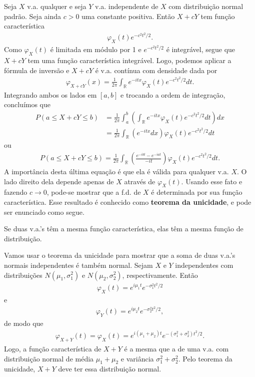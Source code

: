 \documentclass[../Notas.tex]{subfiles}
\begin{document}
Seja $X$ v.a. qualquer e seja $Y$ v.a. independente de $X$ com distribuição normal padrão. Seja ainda $c>0$ uma constante positiva. Então $X+cY$ tem função característica
\begin{align*}
    \varphi_X(t)e^{-c^2t^2/2}.
\end{align*}
Como $\varphi_X(t)$ é limitada em módulo por 1 e $e^{-c^2t^2/2}$ é integrável, segue que $X+cY$ tem uma função característica integrável. Logo, podemos aplicar a fórmula de inversão e $X+cY$ é v.a. contínua com densidade dada por
\begin{align*}
    \varphi_{X+cY}(x) = \frac{1}{2\pi}\int_{\mathbb{R}} e^{-itx}\varphi_X(t)e^{-c^2t^2/2} dt.
\end{align*}
Integrando ambos os lados em $[a,b]$ e trocando a ordem de integração, concluímos que
\begin{align*}
    P(a\leq X+cY\leq b) &= \frac{1}{2\pi}\int_{a}^{b}\left( \int_{\mathbb{R}} e^{-itx}\varphi_X(t)e^{-c^2t^2/2} dt \right) dx \\
    &= \frac{1}{2\pi}\int_{\mathbb{R}}\left( e^{-itx} dx \right)\varphi_X(t) e^{-c^2t^2/2} dt
\end{align*}
ou
\begin{align*}
    P(a\leq X+cY\leq b) = \frac{1}{2\pi}\int_{\mathbb{R}} \left( \frac{e^{-ibt} - e^{-iat}}{-it} \right)\varphi_X(t)e^{-c^2t^2/2} dt.
\end{align*}
A importância desta última equação é que ela é válida para qualquer v.a. $X$. O lado direito dela depende apenas de $X$ através de $\varphi_X(t)$. Usando esse fato e fazendo $c\to 0$, pode-se mostrar que a f.d. de $X$ é determinada por sua função característica. Esse resultado é conhecido como \textbf{teorema da unicidade}, e pode ser enunciado como segue.

\begin{theorem}[Unicidade]
Se duas v.a.'s têm a mesma função característica, elas têm a mesma função de distribuição.
\end{theorem}

\begin{example}
    Vamos usar o teorema da unicidade para mostrar que a soma de duas v.a.'s normais independentes é também normal. Sejam $X$ e $Y$ independentes com distribuições $N(\mu_1, \sigma_1^2)$ e $N(\mu_2, \sigma_2^2)$, respectivamente. Então
    \begin{align*}
        \varphi_X(t) = e^{i\mu_1 t}e^{-\sigma_1^2t^2/2}
    \end{align*}
    e
    \begin{align*}
        \varphi_Y(t) = e^{i\mu_2 t}e^{-\sigma_2^2t^2/2},
    \end{align*}
    de modo que
    \begin{align*}
        \varphi_{X+Y}(t) = \varphi_X(t) = e^{i(\mu_1 + \mu_2)t}e^{-(\sigma_1^2 + \sigma_2^2)t^2/2}.
    \end{align*}
    Logo, a função característica de $X+Y$ é a mesma que a de uma v.a. com distribuição normal de média $\mu_1+\mu_2$ e variância $\sigma_1^2+\sigma_2^2$. Pelo teorema da unicidade, $X+Y$ deve ter essa distribuição normal.
\end{example}
\end{document}
